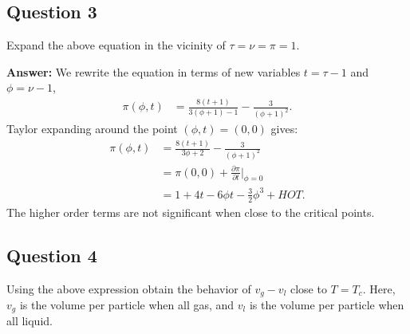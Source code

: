 \documentclass[a4paper]{article}
\newcommand{\newparagraph}{\vspace{.5cm}\noindent}
\begin{document}
\subsection*{Question 3}
Expand the above equation in the vicinity of $\tau = \nu = \pi = 1$.

\newparagraph
\textbf{Answer: }We rewrite the equation in terms of new variables $t = \tau - 1$ and $\phi = \nu - 1$,
\begin{align*}
    \pi(\phi, t) &= \frac{8(t + 1)}{3(\phi + 1) - 1} - \frac{3}{(\phi + 1)^2}.
\end{align*}Taylor expanding around the point $(\phi, t) = (0,0)$ gives:
\begin{align}
    \pi(\phi, t) &= \frac{8(t + 1)}{3\phi + 2} - \frac{3}{(\phi + 1)^2}\nonumber\\
    &= \pi(0,0) + \frac{\partial \pi}{\partial t}\Big|_{\phi = 0}\\
    &= 1 + 4t - 6\phi t -\frac{3}{2}\phi^3 + HOT.\label{eq: expansion}
\end{align}The higher order terms are not significant when close to the critical points.


\subsection*{Question 4}
Using the above expression obtain the behavior of $v_g - v_l$ close to $T = T_c$. Here, $v_g$ is the volume per particle when all gas, and $v_l$ is the volume per particle when all liquid.
\end{document}
